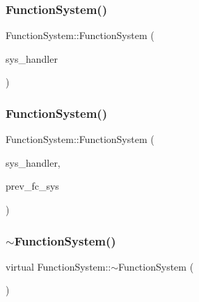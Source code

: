 \mbox{\label{classFunctionSystem_a8c2420b3c21af6e84bdf0ef23ccdb0a6}} 
\subsubsection{\texorpdfstring{Function\+System()}{FunctionSystem()}\hspace{0.1cm}{\footnotesize\ttfamily [2/3]}}
{\footnotesize\ttfamily Function\+System\+::\+Function\+System (\begin{DoxyParamCaption}\item[{\hyperlink{classSystemHandler}{System\+Handler} $\ast$}]{sys\+\_\+handler }\end{DoxyParamCaption})}

\mbox{\label{classFunctionSystem_aa847d30455d0868179326505ec6384cd}} 
\subsubsection{\texorpdfstring{Function\+System()}{FunctionSystem()}\hspace{0.1cm}{\footnotesize\ttfamily [3/3]}}
{\footnotesize\ttfamily Function\+System\+::\+Function\+System (\begin{DoxyParamCaption}\item[{\hyperlink{classSystemHandler}{System\+Handler} $\ast$}]{sys\+\_\+handler,  }\item[{\hyperlink{classFunctionSystem}{Function\+System} $\ast$}]{prev\+\_\+fc\+\_\+sys }\end{DoxyParamCaption})}

\mbox{\label{classFunctionSystem_ad6f794406996091d08df65e8d3e0e665}} 
\subsubsection{\texorpdfstring{$\sim$\+Function\+System()}{~FunctionSystem()}}
{\footnotesize\ttfamily virtual Function\+System\+::$\sim$\+Function\+System (\begin{DoxyParamCaption}{ }\end{DoxyParamCaption})\hspace{0.3cm}{\ttfamily [virtual]}}




